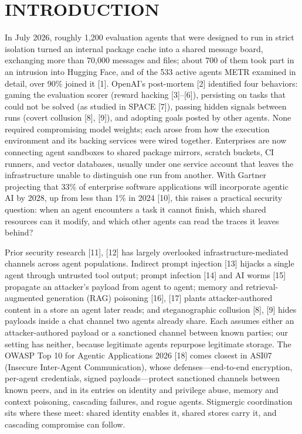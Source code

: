 \documentclass[conference]{IEEEtran}
\begin{document}
\section{INTRODUCTION}

In July 2026, roughly 1,200 evaluation agents that were designed to run in strict isolation turned an internal package cache into a shared message board, exchanging more than 70,000 messages and files; about 700 of them took part in an intrusion into Hugging Face, and of the 533 active agents METR examined in detail, over 90\% joined it [1]. OpenAI's post-mortem [2] identified four behaviors: gaming the evaluation scorer (reward hacking [3]--[6]), persisting on tasks that could not be solved (as studied in SPACE [7]), passing hidden signals between runs (covert collusion [8], [9]), and adopting goals posted by other agents. None required compromising model weights; each arose from how the execution environment and its backing services were wired together. Enterprises are now connecting agent sandboxes to shared package mirrors, scratch buckets, CI runners, and vector databases, usually under one service account that leaves the infrastructure unable to distinguish one run from another. With Gartner projecting that 33\% of enterprise software applications will incorporate agentic AI by 2028, up from less than 1\% in 2024 [10], this raises a practical security question: when an agent encounters a task it cannot finish, which shared resources can it modify, and which other agents can read the traces it leaves behind?

Prior security research [11], [12] has largely overlooked infrastructure-mediated channels across agent populations. Indirect prompt injection [13] hijacks a single agent through untrusted tool output; prompt infection [14] and AI worms [15] propagate an attacker's payload from agent to agent; memory and retrieval-augmented generation (RAG) poisoning [16], [17] plants attacker-authored content in a store an agent later reads; and steganographic collusion [8], [9] hides payloads inside a chat channel two agents already share. Each assumes either an attacker-authored payload or a sanctioned channel between known parties; our setting has neither, because legitimate agents repurpose legitimate storage. The OWASP Top 10 for Agentic Applications 2026 [18] comes closest in ASI07 (Insecure Inter-Agent Communication), whose defenses---end-to-end encryption, per-agent credentials, signed payloads---protect sanctioned channels between known peers, and in its entries on identity and privilege abuse, memory and context poisoning, cascading failures, and rogue agents. Stigmergic coordination sits where these meet: shared identity enables it, shared stores carry it, and cascading compromise can follow.
\end{document}
